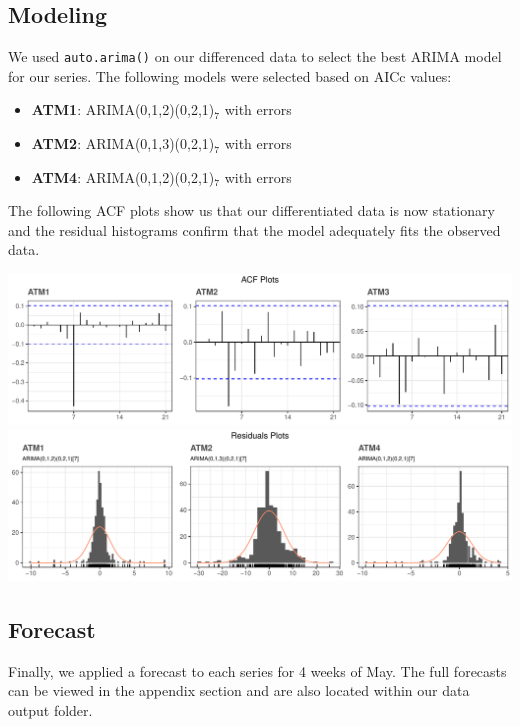 \documentclass[openany]{book}
\providecommand{\tightlist}{%
  \setlength{\itemsep}{0pt}\setlength{\parskip}{0pt}}
\begin{document}
\hypertarget{modeling}{%
\subsection{Modeling}\label{modeling}}

We used \texttt{auto.arima()} on our differenced data to select the best
ARIMA model for our series. The following models were selected based on
AICc values:

\begin{itemize}
\tightlist
\item
  \textbf{ATM1}: ARIMA(0,1,2)(0,2,1)\(_7\) with errors
\item
  \textbf{ATM2}: ARIMA(0,1,3)(0,2,1)\(_7\) with errors
\item
  \textbf{ATM4}: ARIMA(0,1,2)(0,2,1)\(_7\) with errors
\end{itemize}

The following ACF plots show us that our differentiated data is now
stationary and the residual histograms confirm that the model adequately
fits the observed data.

\includegraphics{Part-A-JM_files/figure-latex/unnamed-chunk-6-1.pdf}
\includegraphics{Part-A-JM_files/figure-latex/unnamed-chunk-6-2.pdf}

\hypertarget{forecast}{%
\subsection{Forecast}\label{forecast}}

Finally, we applied a forecast to each series for 4 weeks of May. The
full forecasts can be viewed in the appendix section and are also
located within our data output folder.
\end{document}
